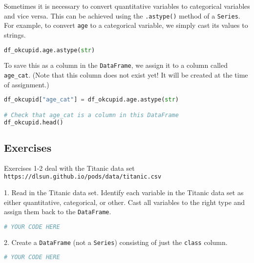 Sometimes it is necessary to convert quantitative variables to categorical variables and vice versa. This can be achieved using the \verb|.astype()| method of a \verb|Series|. For example, to convert \verb|age| to a categorical variable, we simply cast its values to strings.

\begin{lstlisting}[language=Python]
df_okcupid.age.astype(str)
\end{lstlisting}




To save this as a column in the \verb|DataFrame|, we assign it to a column called \verb|age_cat|. (Note that this column does not exist yet! It will be created at the time of assignment.)

\begin{lstlisting}[language=Python]
df_okcupid["age_cat"] = df_okcupid.age.astype(str)

# Check that age_cat is a column in this DataFrame
df_okcupid.head()
\end{lstlisting}




\subsection{Exercises}\label{1.3.4}



Exercises 1-2 deal with the Titanic data set \verb|https://dlsun.github.io/pods/data/titanic.csv|



1. Read in the Titanic data set. Identify each variable in the Titanic data set as either quantitative, categorical, or other. Cast all variables to the right type and assign them back to the \verb|DataFrame|.

\begin{lstlisting}[language=Python]
# YOUR CODE HERE
\end{lstlisting}




2. Create a \verb|DataFrame| (not a \verb|Series|) consisting of just the \verb|class| column.

\begin{lstlisting}[language=Python]
# YOUR CODE HERE
\end{lstlisting}




